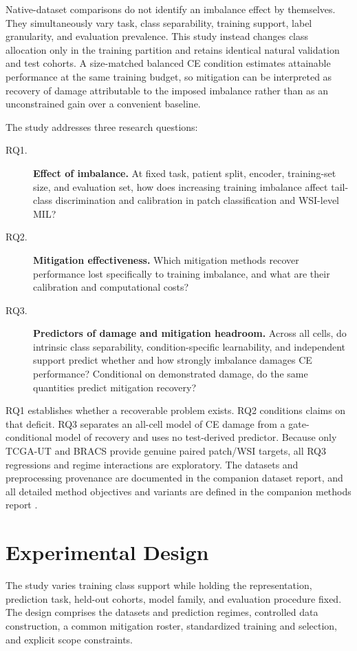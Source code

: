 \documentclass[11pt]{article}
\begin{document}
Native-dataset comparisons do not identify an imbalance effect by themselves. They simultaneously vary task, class separability, training support, label granularity, and evaluation prevalence. This study instead changes class allocation only in the training partition and retains identical natural validation and test cohorts. A size-matched balanced CE condition estimates attainable performance at the same training budget, so mitigation can be interpreted as recovery of damage attributable to the imposed imbalance rather than as an unconstrained gain over a convenient baseline.

The study addresses three research questions:
\begin{description}
  \item[RQ1.] \textbf{Effect of imbalance.} At fixed task, patient split, encoder, training-set size, and evaluation set, how does increasing training imbalance affect tail-class discrimination and calibration in patch classification and WSI-level MIL?
  \item[RQ2.] \textbf{Mitigation effectiveness.} Which mitigation methods recover performance lost specifically to training imbalance, and what are their calibration and computational costs?
  \item[RQ3.] \textbf{Predictors of damage and mitigation headroom.} Across all cells, do intrinsic class separability, condition-specific learnability, and independent support predict whether and how strongly imbalance damages CE performance? Conditional on demonstrated damage, do the same quantities predict mitigation recovery?
\end{description}
RQ1 establishes whether a recoverable problem exists. RQ2 conditions claims on that deficit. RQ3 separates an all-cell model of CE damage from a gate-conditional model of recovery and uses no test-derived predictor. Because only TCGA-UT and BRACS provide genuine paired patch/WSI targets, all RQ3 regressions and regime interactions are exploratory. The datasets and preprocessing provenance are documented in the companion dataset report, and all detailed method objectives and variants are defined in the companion methods report \citep{queisler2026datasets,queisler2026imbalanceMethods}.

\section{Experimental Design}
\label{sec:design}
The study varies training class support while holding the representation, prediction task, held-out cohorts, model family, and evaluation procedure fixed. The design comprises the datasets and prediction regimes, controlled data construction, a common mitigation roster, standardized training and selection, and explicit scope constraints.
\end{document}
